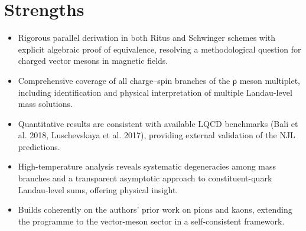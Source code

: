 \documentclass[11pt]{article}
\begin{document}
\section*{Strengths}
\begin{itemize}[leftmargin=*]
  \item Rigorous parallel derivation in both Ritus and Schwinger schemes with explicit algebraic proof of equivalence, resolving a methodological question for charged vector mesons in magnetic fields.
  \item Comprehensive coverage of all charge–spin branches of the ρ meson multiplet, including identification and physical interpretation of multiple Landau-level mass solutions.
  \item Quantitative results are consistent with available LQCD benchmarks (Bali et al. 2018, Luschevskaya et al. 2017), providing external validation of the NJL predictions.
  \item High-temperature analysis reveals systematic degeneracies among mass branches and a transparent asymptotic approach to constituent-quark Landau-level sums, offering physical insight.
  \item Builds coherently on the authors' prior work on pions and kaons, extending the programme to the vector-meson sector in a self-consistent framework.
\end{itemize}
\end{document}
